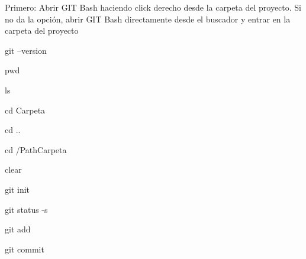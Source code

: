 
Primero: Abrir GIT Bash haciendo click derecho desde la carpeta del proyecto. Si no da la opción, abrir GIT Bash directamente desde el buscador y entrar en la carpeta del proyecto

	git --version		%

	pwd					%

	ls					%

	cd Carpeta			%

	cd ..				%

	cd /PathCarpeta		%

	clear				%



	git init		%

	git status -s	%

	git add			%

	git commit		%












